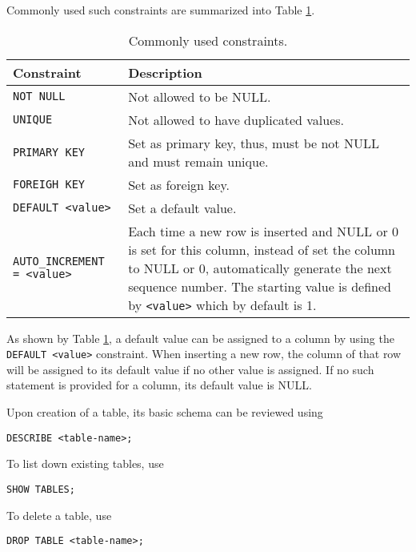 Commonly used such constraints are summarized into Table \ref{ch:db:tab:constraints}.
\begin{table}
	\centering \caption{Commonly used constraints.}\label{ch:db:tab:constraints}
	\begin{tabularx}{\textwidth}{lX}
		\hline
		Constraint & Description \\ \hline
		\verb|NOT NULL| & Not allowed to be NULL. \\ \hdashline
		\verb|UNIQUE| & Not allowed to have duplicated values. \\ \hdashline
        \verb|PRIMARY KEY| & Set as primary key, thus, must be not NULL and must remain unique. \\ \hdashline
        \verb|FOREIGH KEY| & Set as foreign key. \\ \hdashline
        \verb|DEFAULT <value>| & Set a default value. \\ \hdashline
        \verb|AUTO_INCREMENT = <value>| & Each time a new row is inserted and NULL or 0 is set for this column, instead of set the column to NULL or 0, automatically generate the next sequence number. The starting value is defined by \verb|<value>| which by default is 1. \\
		 \hline
	\end{tabularx}
\end{table}
As shown by Table \ref{ch:db:tab:constraints}, a default value can be assigned to a column by using the \verb|DEFAULT <value>| constraint. When inserting a new row, the column of that row will be assigned to its default value if no other value is assigned. If no such statement is provided for a column, its default value is NULL.

Upon creation of a table, its basic schema can be reviewed using
\begin{lstlisting}
DESCRIBE <table-name>;
\end{lstlisting}

To list down existing tables, use
\begin{lstlisting}
SHOW TABLES;
\end{lstlisting}

To delete a table, use
\begin{lstlisting}
DROP TABLE <table-name>;
\end{lstlisting}


